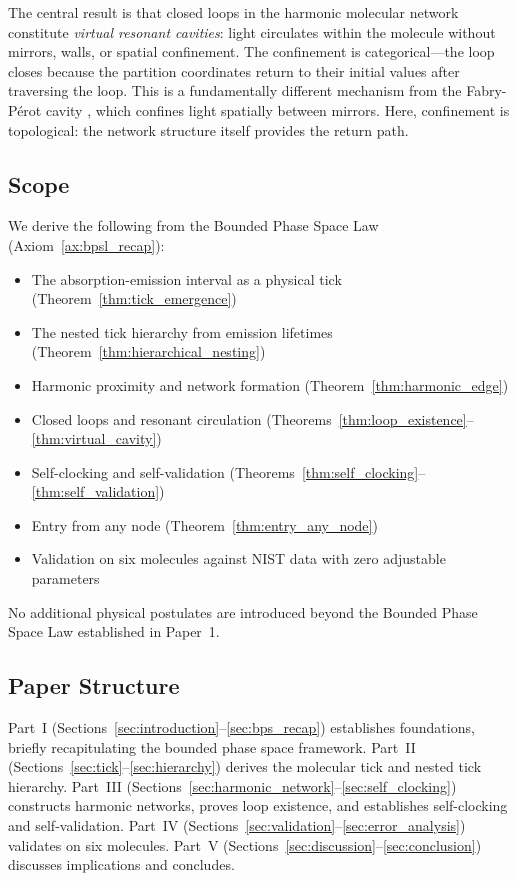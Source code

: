 \documentclass[11pt,twocolumn,a4paper]{article}
\theoremstyle{definition}
\theoremstyle{remark}
\begin{document}
The central result is that closed loops in the harmonic molecular network constitute \emph{virtual resonant cavities}: light circulates within the molecule without mirrors, walls, or spatial confinement. The confinement is categorical---the loop closes because the partition coordinates return to their initial values after traversing the loop. This is a fundamentally different mechanism from the Fabry-P\'{e}rot cavity \citep{fabry1899}, which confines light spatially between mirrors. Here, confinement is topological: the network structure itself provides the return path.

\subsection{Scope}

We derive the following from the Bounded Phase Space Law (Axiom~\ref{ax:bpsl_recap}):
\begin{itemize}[nosep]
\item The absorption-emission interval as a physical tick (Theorem~\ref{thm:tick_emergence})
\item The nested tick hierarchy from emission lifetimes (Theorem~\ref{thm:hierarchical_nesting})
\item Harmonic proximity and network formation (Theorem~\ref{thm:harmonic_edge})
\item Closed loops and resonant circulation (Theorems~\ref{thm:loop_existence}--\ref{thm:virtual_cavity})
\item Self-clocking and self-validation (Theorems~\ref{thm:self_clocking}--\ref{thm:self_validation})
\item Entry from any node (Theorem~\ref{thm:entry_any_node})
\item Validation on six molecules against NIST data with zero adjustable parameters
\end{itemize}

No additional physical postulates are introduced beyond the Bounded Phase Space Law established in Paper~1.

\subsection{Paper Structure}

Part~I (Sections~\ref{sec:introduction}--\ref{sec:bps_recap}) establishes foundations, briefly recapitulating the bounded phase space framework. Part~II (Sections~\ref{sec:tick}--\ref{sec:hierarchy}) derives the molecular tick and nested tick hierarchy. Part~III (Sections~\ref{sec:harmonic_network}--\ref{sec:self_clocking}) constructs harmonic networks, proves loop existence, and establishes self-clocking and self-validation. Part~IV (Sections~\ref{sec:validation}--\ref{sec:error_analysis}) validates on six molecules. Part~V (Sections~\ref{sec:discussion}--\ref{sec:conclusion}) discusses implications and concludes.
\end{document}
